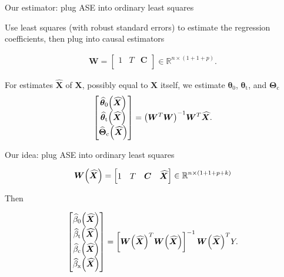 \documentclass{beamer}
\theoremstyle{remark}
\newcommand{\C}{\bm C}
\newcommand{\X}{\bm X}
\newcommand{\W}{\bm W}
\newcommand{\Xhat}{\widehat{\X}}
\newcommand \R {\mathbb{R}}
\newcommand{\thetazero}{\bm \theta_0}
\newcommand{\thetat}{\bm \theta_\text{t}}
\newcommand{\Thetac}{\bm \Theta_\text{c}}
\newcommand \thetazerohat [1] {\widehat{\bm \theta}_0 \paren*{#1}}
\newcommand \thetathat [1] {\widehat{\bm \theta}_\text{t} \paren*{#1}}
\newcommand \Thetachat [1] {\widehat{\bm \Theta}_\text{c} \paren*{#1}}
\newcommand \betazerohat [1] {\widehat{\beta}_0 \paren*{#1}}
\newcommand \betathat [1] {\widehat{\beta}_\text{t} \paren*{#1}}
\newcommand \betachat [1] {\widehat{\beta}_\text{c} \paren*{#1}}
\newcommand \betaxhat [1] {\widehat{\beta}_\text{x} \paren*{#1}}
\DeclarePairedDelimiter{\paren}{(}{)}
\begin{document}
\begin{frame}{Our estimator: plug ASE into ordinary least squares}

    Use least squares (with robust standard errors) to estimate the regression coefficients, then plug into causal estimators

    \begin{align*}
        \W = \begin{bmatrix}
            1 & T & \C \\
        \end{bmatrix} \in \R^{n \times (1 + 1 + p)}.
    \end{align*}

    For estimates $\Xhat$ of $\X$, possibly equal to $\X$ itself, we estimate $\thetazero$, $\thetat$, and $\Thetac$
    \begin{align*}
        \begin{bmatrix}
            \thetazerohat{\Xhat} \\
            \thetathat{\Xhat}    \\
            \Thetachat{\Xhat}
        \end{bmatrix}
        = \paren*{\W^T \W}^{-1} \W^T \Xhat.
    \end{align*}
\end{frame}

\begin{frame}{Our idea: plug ASE into ordinary least squares}

    \begin{align*}
        \W \paren*{\Xhat} = \begin{bmatrix}
            1 & T & \C & \Xhat \\
        \end{bmatrix} \in \R^{n \times (1 + 1 + p + k)}
    \end{align*}

    Then

    \begin{align*}
        \begin{bmatrix}
            \betazerohat{\Xhat} \\
            \betathat{\Xhat}    \\
            \betachat{\Xhat}    \\
            \betaxhat{\Xhat}
        \end{bmatrix}
        = \left[ \W \paren*{\Xhat}^T  \W \paren*{\Xhat} \right]^{-1} \W \paren*{\Xhat}^T Y.
    \end{align*}
\end{frame}
\end{document}
